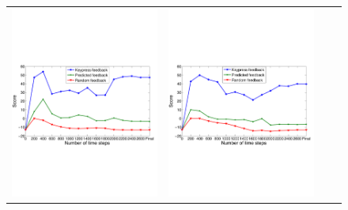 \documentclass[10pt,journal,compsoc]{IEEEtran}
\begin{document}
\begin{figure}[htb]
\centering
\begin{tabular}{c c c c}
\includegraphics[width=0.95\columnwidth]{cond1.pdf}&
\includegraphics[width=0.95\columnwidth]{cond2.pdf}\\

\end{tabular}
\end{figure}
\end{document}
